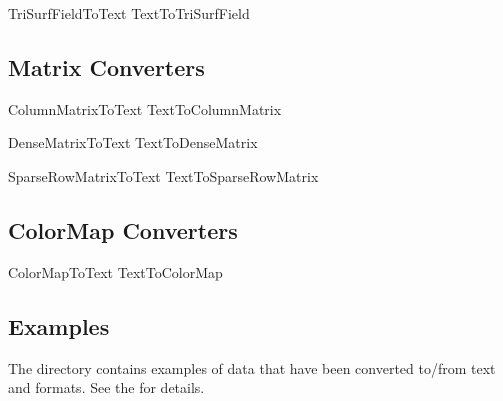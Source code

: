 TriSurfFieldToText
TextToTriSurfField

\subsection{Matrix Converters}

ColumnMatrixToText
TextToColumnMatrix

DenseMatrixToText
TextToDenseMatrix

SparseRowMatrixToText
TextToSparseRowMatrix


\subsection{ColorMap Converters}

ColorMapToText
TextToColorMap

\subsection{Examples}
\label{sec:converter_ex}

The  directory
contains examples of data that have been converted to/from text and
\sr{} formats.  See the 
for details.
